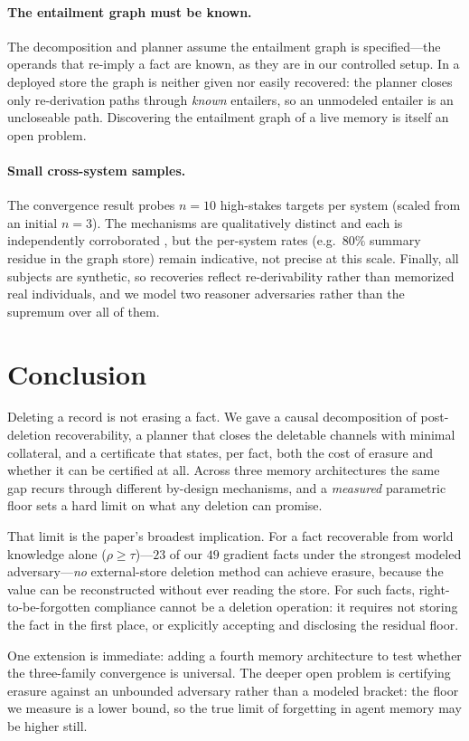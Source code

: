 \documentclass[10pt,twocolumn,letterpaper]{article}
\theoremstyle{definition}
\theoremstyle{plain}
\begin{document}
\paragraph{The entailment graph must be known.}
The decomposition and planner assume the entailment graph is specified---the
operands that re-imply a fact are known, as they are in our controlled setup. In a
deployed store the graph is neither given nor easily recovered: the planner closes
only re-derivation paths through \emph{known} entailers, so an unmodeled entailer
is an uncloseable path. Discovering the entailment graph of a live memory is itself
an open problem.

\paragraph{Small cross-system samples.}
The convergence result probes $n{=}10$ high-stakes targets per system (scaled
from an initial $n{=}3$). The mechanisms are qualitatively distinct and each is
independently corroborated \citep{forgeteval}, but the per-system rates (e.g.\ $80\%$
summary residue in the graph store) remain indicative, not precise at this scale. Finally, all subjects are synthetic, so
recoveries reflect re-derivability rather than memorized real individuals, and we
model two reasoner adversaries rather than the supremum over all of them.

\section{Conclusion}\label{sec:conclusion}

Deleting a record is not erasing a fact. We gave a causal decomposition of
post-deletion recoverability, a planner that closes the deletable channels with
minimal collateral, and a certificate that states, per fact, both the cost of
erasure and whether it can be certified at all. Across three memory architectures
the same gap recurs through different by-design mechanisms, and a \emph{measured}
parametric floor sets a hard limit on what any deletion can promise.

That limit is the paper's broadest implication. For a fact recoverable from world
knowledge alone ($\rho\geq\tau$)---$23$ of our $49$ gradient facts under the
strongest modeled adversary---\emph{no} external-store deletion method can achieve
erasure, because the value can be reconstructed without ever reading the store. For
such facts, right-to-be-forgotten compliance cannot be a deletion operation: it
requires not storing the fact in the first place, or explicitly accepting and
disclosing the residual floor.

One extension is immediate: adding a fourth memory architecture to test whether
the three-family convergence is universal. The deeper
open problem is certifying erasure against an unbounded adversary rather than a
modeled bracket: the floor we measure is a lower bound, so the true limit of
forgetting in agent memory may be higher still.



\end{document}
